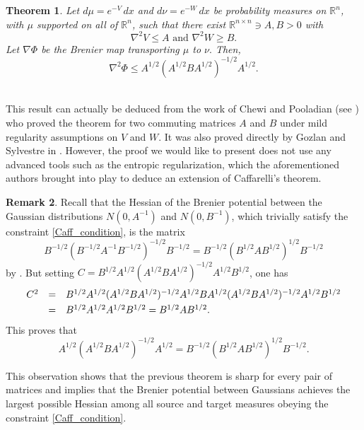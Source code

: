 \documentclass[11pt,a4paper,reqno]{amsart}
\numberwithin{equation}{section}
\newtheorem{theorem}{Theorem}[section]
\theoremstyle{definition}
\newtheorem{remark}[theorem]{Remark}
\newcommand{\nm}{\noalign{\smallskip}}
\newcommand{\<}{\ensuremath \leq}
\renewcommand{\>}{\ensuremath \geq}
\begin{document}
\begin{theorem} \label{General_Caff_Contraction}
    Let $d\mu=e^{-V}\, dx$ and $d\nu=e^{-W}\, dx$ be probability measures on $\mathbb{R}^n$, with $\mu$ supported on all of $\mathbb{R}^n$, such that there exist $\mathbb{R}^{n \times n} \ni A,B>0$ with \begin{equation} \label{Caff_condition}\nabla^2 V \leq A \text{ and } \nabla^2 W \geq B.\end{equation} Let $\nabla \Phi$ be the Brenier map transporting $\mu$ to $\nu.$ Then, $$\nabla^2\Phi \leq A^{1/2}(A^{1/2}BA^{1/2})^{-1/2}A^{1/2}.$$
\end{theorem}

\hfill \\

This result can actually be deduced from the work of Chewi and Pooladian (see \cite{Chewi_Pooladian}) who proved the theorem for two commuting matrices $A$ and $B$ under mild regularity assumptions on $V$ and $W.$ It was also proved directly by Gozlan and Sylvestre in \cite{Gozlan}. 
However, the proof we would like to present does not use any advanced tools such as the entropic regularization, which the aforementioned authors brought into play to deduce an extension of Caffarelli's theorem.

\begin{remark}
Recall that the Hessian of the Brenier potential between the Gaussian distributions $N(0,A^{-1})$ and $N(0,B^{-1})$, which trivially satisfy the constraint \cref{Caff_condition}, is the matrix $$B^{-1/2}(B^{-1/2}A^{-1}B^{-1/2})^{-1/2}B^{-1/2}=B^{-1/2}(B^{1/2}AB^{1/2})^{1/2}B^{-1/2}$$ by \cite[Lemma 2.3]{Takatsu}. But setting $C=B^{1/2}A^{1/2}(A^{1/2}BA^{1/2})^{-1/2}A^{1/2}B^{1/2}$, one has $$\begin{array}{lll}
C^2 &=& B^{1/2}A^{1/2}(A^{1/2}BA^{1/2})^{-1/2}A^{1/2}BA^{1/2}(A^{1/2}BA^{1/2})^{-1/2}A^{1/2}B^{1/2} \\
\nm 
&=& B^{1/2}A^{1/2}A^{1/2}B^{1/2}=B^{1/2}AB^{1/2}.
\end{array}$$ This proves that $$A^{1/2}(A^{1/2}BA^{1/2})^{-1/2}A^{1/2}=B^{-1/2}(B^{1/2}AB^{1/2})^{1/2}B^{-1/2}.$$

This observation shows that the previous theorem is sharp for every pair of matrices and implies that the Brenier potential between Gaussians achieves the largest possible Hessian among all source and target measures obeying the constraint \cref{Caff_condition}. 
\end{remark}

\hfill \\
\end{document}

